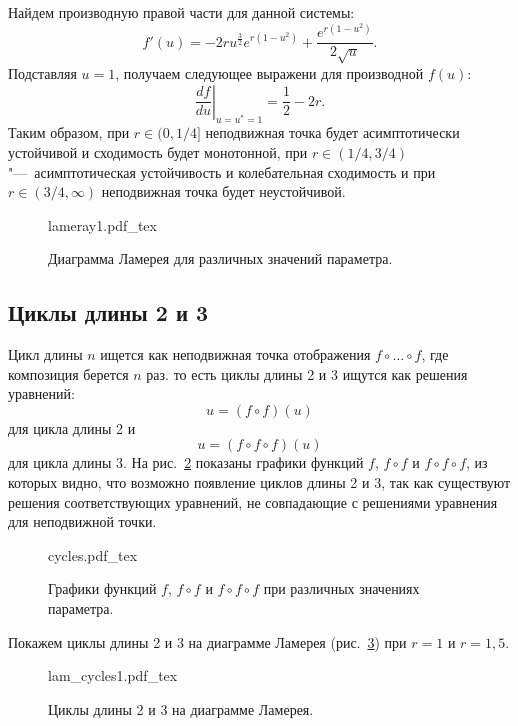 \documentclass[12pt, a4paper]{article} %
\newcommand{\incfig}[1]{%
    \def\svgwidth{\columnwidth}
    {#1.pdf_tex}
}
\begin{document}
Найдем производную правой части для данной системы:
 \begin{equation}
     f'(u) = - 2 r u^{\frac{3}{2}} e^{r \left(1 - u^{2}\right)} + \frac{e^{r \left(1 - u^{2}\right)}}{2 \sqrt{u}}
.\end{equation} 
Подставляя $u = 1$, получаем следующее выражени для производной  $f(u)$:
 \begin{equation}
     \left. \frac{df}{du} \right|_{u=u^*=1} = \frac{1}{2} - 2r
.\end{equation} 
Таким образом, при $r \in (0, 1\!/\!4]$ неподвижная точка будет асимптотически устойчивой и сходимость будет монотонной,
при $r \in (1\!/\!4, 3/\!4)$"---~асимптотическая устойчивость и колебательная сходимость и 
при $r \in (3 /\!4, \infty)$ неподвижная точка будет неустойчивой.

\begin{figure}[ht]
    \centering
    \incfig{lameray1}
    \caption{Диаграмма Ламерея для различных значений параметра.}
    \label{fig:lameray1}
\end{figure}

\subsection{Циклы длины 2 и 3}

Цикл длины $n$ ищется как неподвижная точка отображения  $f\circ \ldots \circ f$, где композиция берется $n$ раз.
то есть циклы длины 2 и 3 ищутся как решения уравнений:
\begin{equation}
    u = (f\circ f)(u)
\end{equation} 
для цикла длины 2 и
\begin{equation}
    u = (f \circ f \circ f)(u)
\end{equation}
для цикла длины 3.
На рис.~\ref{fig:cycles} показаны графики функций $f$,  $f \circ f$ и
$f \circ f \circ f$, из которых видно, что возможно появление циклов длины 2 и 3,
так как существуют решения соответствующих уравнений, не совпадающие с решениями уравнения для неподвижной точки.
\begin{figure}[ht]
    \centering
    \incfig{cycles}
    \caption{Графики функций $f$,  $f \circ f$ и $f \circ f \circ f$ при различных значениях параметра.}
    \label{fig:cycles}
\end{figure}

Покажем циклы длины 2 и 3 на диаграмме Ламерея (рис.~\ref{fig:lam_cycles1}) при $r=1$ и  $r=1{,}5$.

\begin{figure}[ht]
    \centering
    \incfig{lam_cycles1}
    \caption{Циклы длины 2 и 3 на диаграмме Ламерея.}
    \label{fig:lam_cycles1}
\end{figure}
\end{document}

